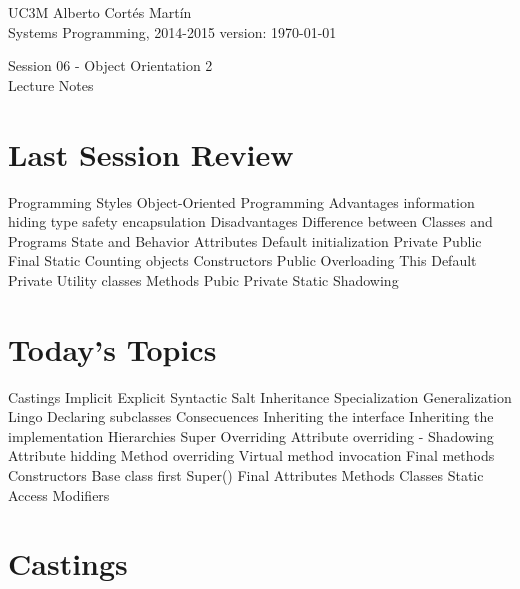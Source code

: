 \documentclass[a4paper, 9pt]{extarticle}
\newcommand{\realtitle}{Session 06 - Object Orientation 2}
\begin{document}
\makebox[\linewidth]{\rule{\textwidth}{0.4pt}}
UC3M \hfill Alberto Cortés Martín\\
Systems Programming, 2014-2015 \hfill version: \today\\
\makebox[\linewidth]{\rule{\textwidth}{0.4pt}}
\begin{center}
  \Large{\realtitle}\\Lecture Notes
\end{center}
\makebox[\linewidth]{\rule{\textwidth}{0.4pt}}
\vspace{1cm}

\section{Last Session Review}

\begin{blackboard}
Programming Styles
Object-Oriented Programming
  Advantages
    information hiding
    type safety
    encapsulation
  Disadvantages
Difference between Classes and Programs
State and Behavior
Attributes
  Default initialization
  Private
  Public
  Final
  Static
    Counting objects
Constructors
  Public
  Overloading
  This
  Default
  Private
    Utility classes
Methods
  Pubic
  Private
  Static
Shadowing
\end{blackboard}









\section{Today's Topics}
\begin{blackboard}
Castings
  Implicit
  Explicit
  Syntactic Salt
Inheritance
  Specialization
  Generalization
  Lingo
  Declaring subclasses
  Consecuences
    Inheriting the interface
    Inheriting the implementation
  Hierarchies
  Super
  Overriding
    Attribute overriding - Shadowing
      Attribute hidding
    Method overriding
      Virtual method invocation
      Final methods
  Constructors
    Base class first
    Super()
  Final
    Attributes
    Methods
    Classes
  Static
  Access Modifiers
\end{blackboard}









\section{Castings}
\end{document}
